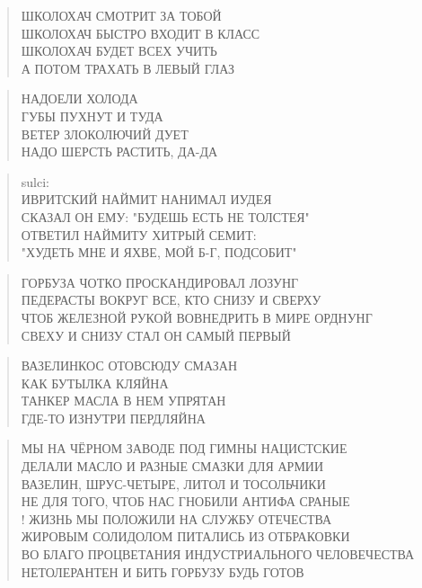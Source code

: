 \poemtitle{***}
\begin{verse}
ШКОЛОХАЧ СМОТРИТ ЗА ТОБОЙ\\
ШКОЛОХАЧ БЫСТРО ВХОДИТ В КЛАСС\\
ШКОЛОХАЧ БУДЕТ ВСЕХ УЧИТЬ\\
А ПОТОМ ТРАХАТЬ В ЛЕВЫЙ ГЛАЗ
\end{verse}

\poemtitle{***}
\begin{verse}
НАДОЕЛИ ХОЛОДА\\
ГУБЫ ПУХНУТ И ТУДА\\
ВЕТЕР ЗЛОКОЛЮЧИЙ ДУЕТ\\
НАДО ШЕРСТЬ РАСТИТЬ, ДА-ДА
\end{verse}

\poemtitle{***}
\begin{verse}
sulci:\\
ИВРИТСКИЙ НАЙМИТ НАНИМАЛ ИУДЕЯ\\
СКАЗАЛ ОН ЕМУ: "БУДЕШЬ ЕСТЬ НЕ ТОЛСТЕЯ"\\
ОТВЕТИЛ НАЙМИТУ ХИТРЫЙ СЕМИТ:\\
"ХУДЕТЬ МНЕ И ЯХВЕ, МОЙ Б-Г, ПОДСОБИТ"
\end{verse}

\poemtitle{***}
\begin{verse}
ГОРБУЗА ЧОТКО ПРОСКАНДИРОВАЛ ЛОЗУНГ\\
ПЕДЕРАСТЫ ВОКРУГ ВСЕ, КТО СНИЗУ И СВЕРХУ\\
ЧТОБ ЖЕЛЕЗНОЙ РУКОЙ ВОВНЕДРИТЬ В МИРЕ ОРДНУНГ\\
СВЕХУ И СНИЗУ СТАЛ ОН САМЫЙ ПЕРВЫЙ
\end{verse}

\poemtitle{***}
\begin{verse}
ВАЗЕЛИНКОС ОТОВСЮДУ СМАЗАН\\
КАК БУТЫЛКА КЛЯЙНА\\
ТАНКЕР МАСЛА В НЕМ УПРЯТАН\\
ГДЕ-ТО ИЗНУТРИ ПЕРДЛЯЙНА
\end{verse}

\poemtitle{***}
\begin{verse}
МЫ НА ЧЁРНОМ ЗАВОДЕ ПОД ГИМНЫ НАЦИСТСКИЕ\\
ДЕЛАЛИ МАСЛО И РАЗНЫЕ СМАЗКИ ДЛЯ АРМИИ\\
ВАЗЕЛИН, ШРУС-ЧЕТЫРЕ, ЛИТОЛ И ТОСОЛЬЧИКИ\\
НЕ ДЛЯ ТОГО, ЧТОБ НАС ГНОБИЛИ АНТИФА СРАНЫЕ\\!
ЖИЗНЬ МЫ ПОЛОЖИЛИ НА СЛУЖБУ ОТЕЧЕСТВА\\
ЖИРОВЫМ СОЛИДОЛОМ ПИТАЛИСЬ ИЗ ОТБРАКОВКИ\\
ВО БЛАГО ПРОЦВЕТАНИЯ ИНДУСТРИАЛЬНОГО ЧЕЛОВЕЧЕСТВА\\
НЕТОЛЕРАНТЕН И БИТЬ ГОРБУЗУ БУДЬ ГОТОВ
\end{verse}

